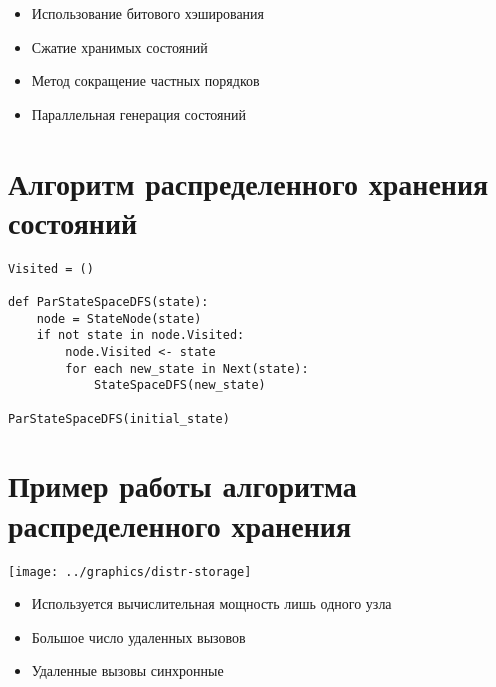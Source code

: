 \documentclass[12pt]{article}
\begin{document}
\begin{minipage}[t]{0.5\linewidth}
  \begin{flushleft}
    \begin{itemize}
    \item Использование битового \mbox{хэширования}
    \item Сжатие хранимых состояний
    \item Метод сокращение частных порядков
    \end{itemize}
  \end{flushleft}
\end{minipage}
\begin{minipage}[t]{0.5\linewidth}
  \begin{flushleft}
    \begin{itemize}
    \item Параллельная \mbox{генерация} состояний
    \end{itemize}
  \end{flushleft}
\end{minipage}

\section{Алгоритм распределенного хранения состояний}
\label{sec:distr-storage}

\begin{lstlisting}[style=pseudocode]
Visited = ()

def ParStateSpaceDFS(state):
    node = StateNode(state)
    if not state in node.Visited:
        node.Visited <- state
        for each new_state in Next(state):
            StateSpaceDFS(new_state)

ParStateSpaceDFS(initial_state)
\end{lstlisting}

\section{Пример работы алгоритма распределенного хранения}
\label{sec:distr-storage2}

\begin{minipage}[m]{0.5\linewidth}
  \texttt{[image: ../graphics/distr-storage]}
\end{minipage}
\begin{minipage}[m]{0.5\linewidth}
  \begin{flushleft}
    \begin{itemize}
    \item Используется вычислительная мощность лишь одного узла
    \item Большое число удаленных вызовов
    \item Удаленные вызовы синхронные
    \end{itemize}
  \end{flushleft}
\end{minipage}
\end{document}
